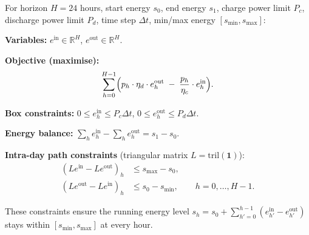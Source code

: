 \documentclass[11pt, a4paper]{article}
\theoremstyle{plain}
\theoremstyle{definition}
\newcommand{\R}{\mathbb{R}}
\begin{document}
For horizon $H = 24$ hours, start energy $s_0$, end energy $s_1$,
charge power limit $P_c$, discharge power limit $P_d$,
time step $\Delta t$, min/max energy $[s_{\min}, s_{\max}]$:

\textbf{Variables:} $e^{\mathrm{in}} \in \R^H$, $e^{\mathrm{out}} \in \R^H$.

\textbf{Objective (maximise):}
\begin{equation}
  \sum_{h=0}^{H-1}
  \Bigl(
    p_h \cdot \eta_d \cdot e^{\mathrm{out}}_h
    \;-\;
    \frac{p_h}{\eta_c} \cdot e^{\mathrm{in}}_h
  \Bigr).
\end{equation}

\textbf{Box constraints:}
$0 \leq e^{\mathrm{in}}_h \leq P_c \Delta t$,\quad
$0 \leq e^{\mathrm{out}}_h \leq P_d \Delta t$.

\textbf{Energy balance:}
$\displaystyle\sum_{h} e^{\mathrm{in}}_h - \sum_{h} e^{\mathrm{out}}_h = s_1 - s_0$.

\textbf{Intra-day path constraints} (triangular matrix $L = \mathrm{tril}(\mathbf{1})$):
\begin{align}
  (Le^{\mathrm{in}} - Le^{\mathrm{out}})_h &\leq s_{\max} - s_0, \\
  (Le^{\mathrm{out}} - Le^{\mathrm{in}})_h &\leq s_0 - s_{\min},
  \qquad h = 0, \ldots, H{-}1.
\end{align}

These constraints ensure the running energy level
$s_h = s_0 + \sum_{h'=0}^{h-1}(e^{\mathrm{in}}_{h'} - e^{\mathrm{out}}_{h'})$
stays within $[s_{\min}, s_{\max}]$ at every hour.
\end{document}

